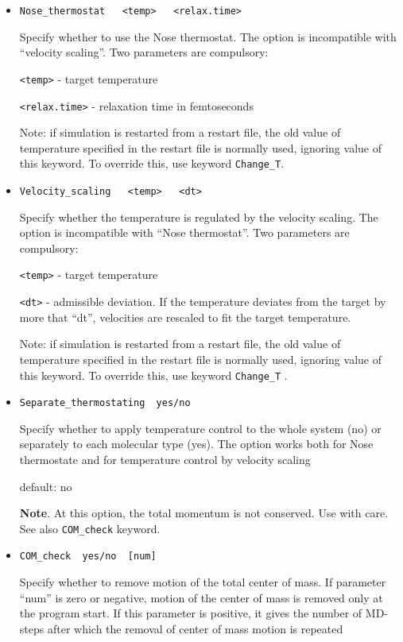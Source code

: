 \documentclass{article}
\begin{document}
\begin{itemize}

\item
\verb|Nose_thermostat   <temp>   <relax.time>|

Specify whether to use the Nose thermostat. The option is incompatible with 
``velocity scaling''. Two parameters are compulsory:

\verb|<temp>|  - target temperature

\verb|<relax.time>| - relaxation time in femtoseconds

Note: if simulation is restarted from a restart file, the old value of 
temperature specified in the restart file is normally used, ignoring value 
of this keyword. To override this, use keyword \verb|Change_T|.

\item
\verb|Velocity_scaling   <temp>   <dt>|  

Specify whether the temperature is regulated by the velocity scaling.
The option is incompatible with ``Nose thermostat''. Two
parameters are compulsory:

\verb|<temp>|  - target temperature

\verb|<dt>| - admissible deviation. If the temperature deviates from the 
target by more that ``dt'', velocities are rescaled to fit the
target temperature.
 
Note: if simulation is restarted from a restart file, the old value of 
temperature specified in the restart file is normally used, ignoring value 
of this keyword. To override this, use keyword \verb|Change_T| .

\item
\verb|Separate_thermostating  yes/no|

Specify whether to apply temperature control to the whole system (no)
or separately to each molecular type (yes). The option works both for Nose
thermostate and for temperature control by velocity scaling

default: no

{\bf Note}. At this option, the total momentum is not conserved. Use with care.
See also \verb|COM_check| keyword.

\item
\verb|COM_check  yes/no  [num]|

Specify whether to remove motion of the total center of mass.
If parameter ``num'' is zero or negative, motion of the center of
mass is removed only at the program start. If this parameter is positive, 
it gives the number of MD-steps after which the removal of center of mass
motion is repeated


\end{itemize}
\end{document}
